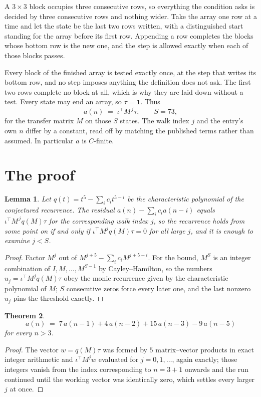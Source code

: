 \documentclass[11pt,a4paper]{article}
\theoremstyle{plain}
\newtheorem{theorem}{Theorem}
\newtheorem{lemma}[theorem]{Lemma}
\theoremstyle{definition}
\begin{document}
A $3\times3$ block occupies three consecutive rows, so everything the condition asks is decided
by three consecutive rows and nothing wider. Take the array one row at a time and let the state
be the last two rows written, with a distinguished start standing for the array before its
first row. Appending a row completes the blocks whose bottom row is the new one, and the step
is allowed exactly when each of those blocks passes.

Every block of the finished array is tested exactly once, at the step that writes its bottom
row, and no step imposes anything the definition does not ask. The first two rows complete no
block at all, which is why they are laid down without a test. Every state may end an array, so
$\tau=\mathbf{1}$. Thus
\[
a(n)\;=\;\iota^{\!\top}M^{\,j}\tau ,\qquad S=73,
\]
for the transfer matrix $M$ on those $S$ states. The walk index $j$ and the entry's own $n$
differ by a constant, read off by matching the published terms rather than assumed. In
particular $a$ is $C$-finite.

\section{The proof}

\begin{lemma}\label{lem:crit}
Let $q(t)=t^{5}-\sum_i c_it^{5-i}$ be the characteristic polynomial of the
conjectured recurrence. The residual $a(n)-\sum_ic_ia(n-i)$ equals
$\iota^{\!\top}M^{\,j}q(M)\tau$ for the corresponding walk index $j$, so the recurrence
holds from some point on if and only if $\iota^{\!\top}M^{j}q(M)\tau=0$ for all large $j$,
and it is enough to examine $j<S$.
\end{lemma}

\begin{proof}
Factor $M^{j}$ out of $M^{j+5}-\sum_ic_iM^{j+5-i}$. For the bound, $M^{S}$
is an integer combination of $I,M,\dots,M^{S-1}$ by Cayley--Hamilton, so the numbers
$u_j=\iota^{\!\top}M^{j}q(M)\tau$ obey the monic recurrence given by the characteristic
polynomial of $M$; $S$ consecutive zeros force every later one, and the last nonzero $u_j$
pins the threshold exactly.
\end{proof}

\begin{theorem}
\[
a(n)\;=\;7\,a(n-1) + 4\,a(n-2) + 15\,a(n-3) - 9\,a(n-5)
\]
for every $n>3$.
\end{theorem}

\begin{proof}
The vector $w=q(M)\tau$ was formed by $5$ matrix--vector products in exact integer
arithmetic and $\iota^{\!\top}M^{j}w$ evaluated for $j=0,1,\dots$, again exactly; those
integers vanish from the index corresponding to $n=3+1$ onwards and the run continued
until the working vector was identically zero, which settles every larger $j$ at once.
\end{proof}
\end{document}
